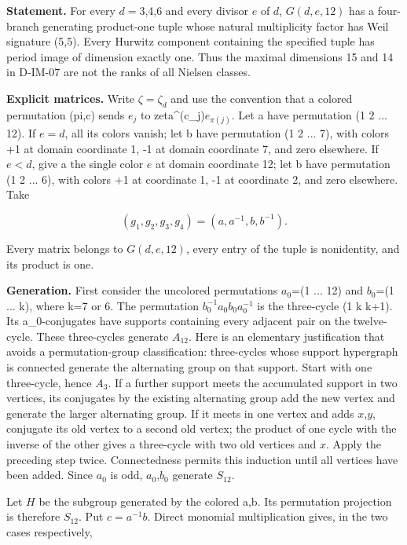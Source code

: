 \textbf{Statement.} For every \(d= 3\),4,6 and every divisor \(e\) of \(d\), \(G(d,e,12)\) has a four-branch generating product-one tuple whose natural multiplicity factor has Weil signature (5,5). Every Hurwitz component containing the specified tuple has period image of dimension exactly one. Thus the maximal dimensions 15 and 14 in D-IM-07 are not the ranks of all Nielsen classes.

\textbf{Explicit matrices.} Write \(\zeta=\zeta_d\) and use the convention that a colored permutation (pi,c) sends \(e_j\) to zeta\textasciicircum{}(c\_j)\(e_{\pi(j)}\). Let a have permutation (1 2 ... 12). If \(e= d\), all its colors vanish; let b have permutation (1 2 ... 7), with colors +1 at domain coordinate 1, -1 at domain coordinate 7, and zero elsewhere. If \(e< d\), give a the single color \(e\) at domain coordinate 12; let b have permutation (1 2 ... 6), with colors +1 at coordinate 1, -1 at coordinate 2, and zero elsewhere. Take

\[
(g_1,g_2,g_3,g_4)=(a,a^{-1},b,b^{-1}).
\]

Every matrix belongs to \(G(d,e,12)\), every entry of the tuple is nonidentity, and its product is one.

\textbf{Generation.} First consider the uncolored permutations \(a_0\)=(1 ... 12) and \(b_0\)=(1 ... k), where k=7 or 6. The permutation \(b_0^{-1}a_0b_0a_0^{-1}\) is the three-cycle (1 k k+1). Its a\_0-conjugates have supports containing every adjacent pair on the twelve-cycle. These three-cycles generate \(A_{12}\). Here is an elementary justification that avoids a permutation-group classification: three-cycles whose support hypergraph is connected generate the alternating group on that support. Start with one three-cycle, hence \(A_3\). If a further support meets the accumulated support in two vertices, its conjugates by the existing alternating group add the new vertex and generate the larger alternating group. If it meets in one vertex and adds \(x\),\(y\), conjugate its old vertex to a second old vertex; the product of one cycle with the inverse of the other gives a three-cycle with two old vertices and \(x\). Apply the preceding step twice. Connectedness permits this induction until all vertices have been added. Since \(a_0\) is odd, \(a_0\),\(b_0\) generate \(S_{12}\).

Let \(H\) be the subgroup generated by the colored a,b. Its permutation projection is therefore \(S_{12}\). Put \(c=a^{-1}b\). Direct monomial multiplication gives, in the two cases respectively,

